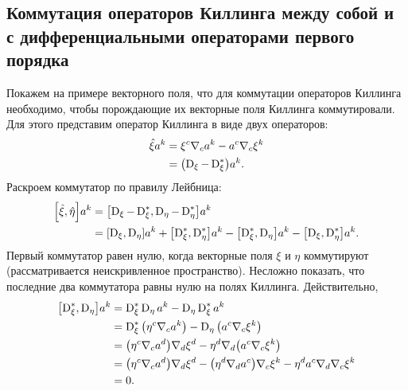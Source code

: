 \documentclass[12pt,a4paper]{article}
\begin{document}
        \subsection{Коммутация операторов Киллинга между собой и с дифференциальными операторами первого порядка}

            Покажем на примере векторного поля, что для коммутации операторов Киллинга необходимо, чтобы порождающие их векторные поля Киллинга коммутировали. Для этого представим оператор Киллинга в виде двух операторов:
            \begin{equation}\begin{aligned}
                \hat{\mathbf{\xi}} a^k
                    &= \xi^c \nabla_c a^k - a^c \nabla_c \xi^k \\
                    &= \qty(\operatorname{D}_\xi - \operatorname{D}^{*}_\xi) a^k .
            \end{aligned}\end{equation}
            Раскроем коммутатор по правилу Лейбница:
            \begin{equation}\begin{aligned}
                \comm{\Op{\xi}}{\Op{\eta}} a^k
                    &= \comm{\D_\xi - \D^{*}_\xi}{\D_\eta - \D^{*}_\eta} a^k \\
                    &= \comm{\D_\xi}{\D_\eta}  a^k
                     + \comm{\D^{*}_\xi}{\D^{*}_\eta} a^k
                     - \comm{\D^{*}_\xi}{\D_\eta} a^k
                     - \comm{\D_\xi}{\D^{*}_\eta} a^k .
            \end{aligned}\end{equation}
            Первый коммутатор равен нулю, когда векторные поля $\xi$ и $\eta$ коммутируют (рассматривается неискривленное пространство). Несложно показать, что последние два коммутатора равны нулю на полях Киллинга. Действительно,
            \begin{equation}\begin{aligned}
                \comm{\D^{*}_\xi}{\D_\eta} a^k
                    &= \D^{*}_\xi \D_\eta a^k - \D_\eta \D^{*}_\xi a^k \\
                    &= \D^{*}_\xi \qty( \eta^c \nabla_c a^k )
                     - \D_\eta \qty( a^c \nabla_c \xi^k ) \\
                    &= \qty( \eta^c \nabla_c a^d ) \nabla_d \xi^d
                     - \eta^d \nabla_d \qty( a^c \nabla_c \xi^k ) \\
                    &= \qty( \eta^c \nabla_c a^d ) \nabla_d \xi^d
                     - \qty( \eta^d \nabla_d a^c ) \nabla_c \xi^k
                     - \eta^d a^c \nabla_d \nabla_c \xi^k \\
                    &= 0 .
            \end{aligned}\end{equation}
\end{document}
